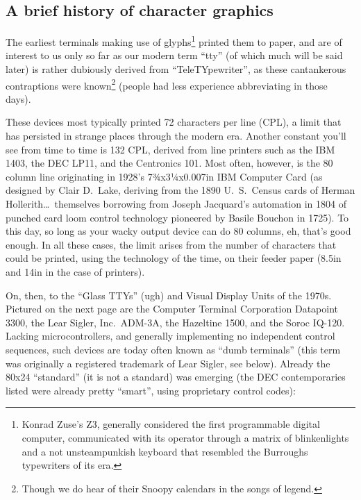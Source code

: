 \documentclass[letterpaper,10pt]{article}
\begin{document}
\newpage

\begin{appendices}
\section{A brief history of character graphics}
The earliest terminals making use of glyphs\footnote{Konrad Zuse's Z3, generally
 considered the first programmable digital computer, communicated with its
operator through a matrix of blinkenlights and a not unsteampunkish keyboard that resembled the
Burroughs typewriters of its era\cite{zuse}.} printed them to paper, and are of
interest to us only so far as our modern term ``tty'' (of which much will be
said later) is rather dubiously derived from ``TeleTYpewriter'', as these
cantankerous contraptions were known\footnote{Though we do hear of their Snoopy
calendars in the songs of legend\cite{quiche}.} (people had less experience
abbreviating in those days).

These devices most typically printed 72 characters per line (CPL), a limit that
has persisted in strange places\cite{pandoc} through the modern era. Another constant
you'll see from time to time is 132 CPL, derived from line printers such as the
IBM 1403, the DEC LP11, and the Centronics 101\cite{ibm1403}. Most often,
however, is the 80 column line originating in 1928's 7¾x3¼x0.007in IBM
Computer Card (as designed by Clair D.\ Lake, deriving from the 1890 U.\ S.\
Census cards of Herman Hollerith\ldots\ themselves borrowing from Joseph
Jacquard's automation in 1804 of punched card loom control technology pioneered
by Basile Bouchon in 1725\cite{cards}). To this day, so long as your wacky
output device can do 80 columns, eh, that's good enough. In all these cases,
the limit arises from the number of characters that could be printed, using the
technology of the time, on their feeder paper (8.5in and 14in in the case of
printers).

On, then, to the ``Glass TTYs'' (ugh) and Visual Display Units of the 1970s.
Pictured on the next page are the Computer Terminal Corporation Datapoint 3300, the
Lear Sigler, Inc.\ ADM-3A, the Hazeltine 1500, and the Soroc IQ-120.
Lacking microcontrollers, and generally implementing no independent control
sequences, such devices are today often known as ``dumb terminals'' (this term
was originally a registered trademark of Lear Sigler, see below). Already the
80x24 ``standard'' (it is not a standard) was emerging (the DEC contemporaries
listed were already pretty ``smart'', using proprietary control codes):


\end{appendices}
\end{document}
